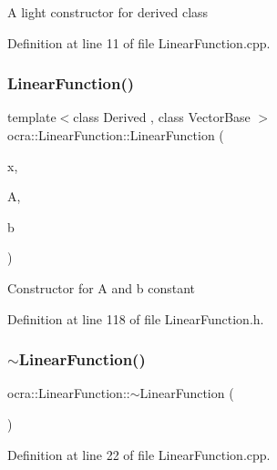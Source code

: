A light constructor for derived class 

Definition at line 11 of file Linear\+Function.\+cpp.

\hypertarget{classocra_1_1LinearFunction_afb4fddc341c3c726f346acc962bead78}{}\label{classocra_1_1LinearFunction_afb4fddc341c3c726f346acc962bead78} 
\subsubsection{\texorpdfstring{Linear\+Function()}{LinearFunction()}\hspace{0.1cm}{\footnotesize\ttfamily [2/2]}}
{\footnotesize\ttfamily template$<$class Derived , class Vector\+Base $>$ \\
ocra\+::\+Linear\+Function\+::\+Linear\+Function (\begin{DoxyParamCaption}\item[{\hyperlink{classocra_1_1Variable}{Variable} \&}]{x,  }\item[{const Matrix\+Base$<$ Derived $>$ \&}]{A,  }\item[{const Vector\+Base \&}]{b }\end{DoxyParamCaption})\hspace{0.3cm}{\ttfamily [inline]}}

Constructor for A and b constant 

Definition at line 118 of file Linear\+Function.\+h.

\hypertarget{classocra_1_1LinearFunction_a0bdb80bc2a85566bc02dd143b6db7fdf}{}\label{classocra_1_1LinearFunction_a0bdb80bc2a85566bc02dd143b6db7fdf} 
\subsubsection{\texorpdfstring{$\sim$\+Linear\+Function()}{~LinearFunction()}}
{\footnotesize\ttfamily ocra\+::\+Linear\+Function\+::$\sim$\+Linear\+Function (\begin{DoxyParamCaption}{ }\end{DoxyParamCaption})}



Definition at line 22 of file Linear\+Function.\+cpp.




